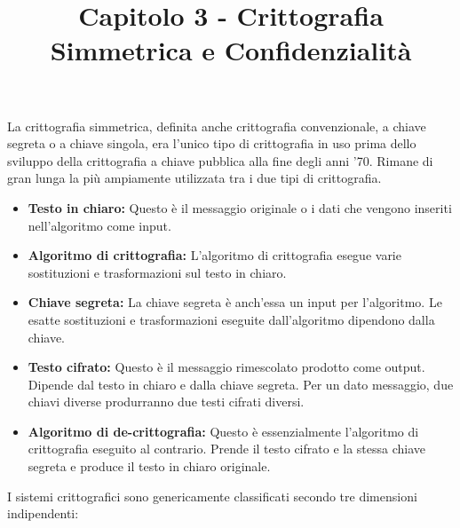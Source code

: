 \documentclass{article}
\title{Capitolo 3 - Crittografia Simmetrica e Confidenzialità}
\author{}
\date{}
\begin{document}
\maketitle

\noindent
La crittografia simmetrica, definita anche crittografia convenzionale, a chiave segreta o a chiave singola, era l'unico tipo di crittografia in uso prima dello sviluppo della crittografia a chiave pubblica alla fine degli anni '70. Rimane di gran lunga la più ampiamente utilizzata tra i due tipi di crittografia.

\begin{itemize}
    \item \textbf{Testo in chiaro:} Questo è il messaggio originale o i dati che vengono inseriti nell'algoritmo come input.
    \item \textbf{Algoritmo di crittografia:} L'algoritmo di crittografia esegue varie sostituzioni e trasformazioni sul testo in chiaro.
    \item \textbf{Chiave segreta:} La chiave segreta è anch'essa un input per l'algoritmo. Le esatte sostituzioni e trasformazioni eseguite dall'algoritmo dipendono dalla chiave.
    \item \textbf{Testo cifrato:} Questo è il messaggio rimescolato prodotto come output. Dipende dal testo in chiaro e dalla chiave segreta. Per un dato messaggio, due chiavi diverse produrranno due testi cifrati diversi.
    \item \textbf{Algoritmo di de-crittografia:} Questo è essenzialmente l'algoritmo di crittografia eseguito al contrario. Prende il testo cifrato e la stessa chiave segreta e produce il testo in chiaro originale.
\end{itemize}

I sistemi crittografici sono genericamente classificati secondo tre dimensioni indipendenti:
\end{document}
